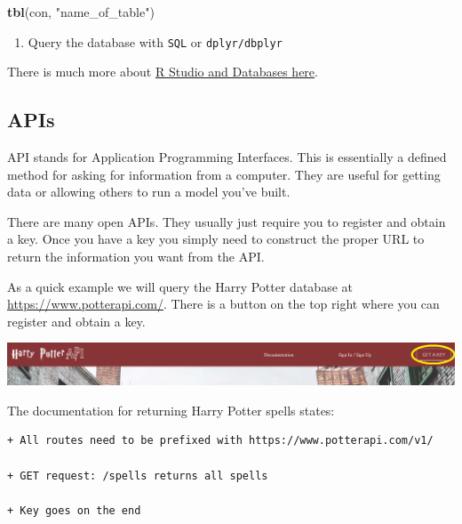 \documentclass[
]{book}
\newenvironment{Shaded}{\begin{snugshade}}{\end{snugshade}}
\newcommand{\KeywordTok}[1]{\textcolor[rgb]{0.13,0.29,0.53}{\textbf{#1}}}
\newcommand{\NormalTok}[1]{#1}
\newcommand{\StringTok}[1]{\textcolor[rgb]{0.31,0.60,0.02}{#1}}
\providecommand{\tightlist}{%
  \setlength{\itemsep}{0pt}\setlength{\parskip}{0pt}}
\theoremstyle{definition}
\theoremstyle{definition}
\theoremstyle{definition}
\theoremstyle{remark}
\begin{document}
\begin{Shaded}
\begin{Highlighting}[]
\KeywordTok{tbl}\NormalTok{(con, }\StringTok{"name_of_table"}\NormalTok{)}
\end{Highlighting}
\end{Shaded}

\begin{enumerate}
\def\labelenumi{\arabic{enumi}.}
\setcounter{enumi}{2}
\tightlist
\item
  Query the database with \texttt{SQL} or \texttt{dplyr/dbplyr}
\end{enumerate}

There is much more about \href{https://db.rstudio.com/}{R Studio and Databases here}.

\hypertarget{apis}{%
\subsection{APIs}\label{apis}}

API stands for Application Programming Interfaces. This is essentially a defined method for asking for information from a computer. They are useful for getting data or allowing others to run a model you've built.

There are many open APIs. They usually just require you to register and obtain a key. Once you have a key you simply need to construct the proper URL to return the information you want from the API.

As a quick example we will query the Harry Potter database at \url{https://www.potterapi.com/}. There is a button on the top right where you can register and obtain a key.

\begin{center}\includegraphics[width=0.8\linewidth]{img/HPAPI} \end{center}

The documentation for returning Harry Potter spells states:

\begin{verbatim}
+ All routes need to be prefixed with https://www.potterapi.com/v1/  

+ GET request: /spells returns all spells 

+ Key goes on the end  
\end{verbatim}
\end{document}
